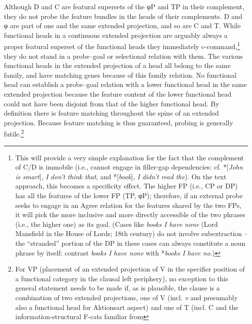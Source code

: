 \documentclass[output=paper]{langsci/langscibook}
\begin{document}
\begin{refcontext}
Although D and C are featural supersets of the φ{}P and TP in their
complement, they do not probe the feature bundles in the heads of their
complements. D and φ{} are part of one and the same extended projection,
and so are C and T. While functional heads in a continuous extended projection
are arguably always a proper featural superset of the functional heads they
immediately c-command,\footnote{This will provide a very simple explanation for
    the fact that the complement of C/D is immobile (i.e., cannot engage in
    filler-gap dependencies: cf. *[\emph{John is smart}], \emph{I don't think
    that}, and *[\emph{book}], \emph{I didn’t read the}). On the text approach,
    this becomes a specificity effect. The higher FP (i.e., CP or DP) has all
    the features of the lower FP (TP, φ{}P); therefore, if an external
    probe seeks to engage in an Agree relation for the features shared by the
    two FPs, it will pick the more inclusive and more directly accessible of
    the two phrases (i.e., the higher one) as its goal. (Cases like \emph{books
        I have none} (Lord Mansfield in the House of Lords; 18th century)
    do not involve subextraction -- the \enquote{stranded} portion of the DP in
these cases can always constitute a noun phrase by itself: contrast \emph{books
I have none} with *\emph{books I have no}.)} they do not stand in a probe--goal
or selectional relation with them. The various functional heads in the extended
projection of a head all belong to the same family, and have matching genes
because of this family relation. No functional head can establish a probe--goal
relation with a lower functional head in the same extended projection because
the feature content of the lower functional head could not have been disjoint
from that of the higher functional head. By definition there is feature
matching throughout the spine of an extended projection. Because feature
matching is thus guaranteed, probing is generally futile.\footnote{For VP
     (placement of an extended projection of V in the specifier
    position of a functional category in the clausal left periphery), no
    exception to this general statement needs to be made if, as is plausible,
    the clause is a combination of two extended projections, one of V (incl.
    \emph{v} and presumably also a functional head for Aktionsart aspect) and
    one of T (incl. C and the information-structural F-cats familiar from
}
\end{refcontext}
\end{document}
